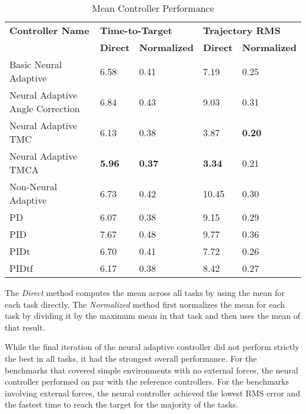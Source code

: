 \documentclass[letterpaper,12pt,titlepage,oneside,final]{book}
\begin{document}
\begin{table}
\begin{threeparttable}
\caption{Mean Controller Performance} \label{table:mean_task_ranking}
\begin{tabular}{| l | l | l | l | l |}
\hline
\textbf{Controller Name} & \multicolumn{2}{l|}{\textbf{Time-to-Target}} & \multicolumn{2}{l|}{\textbf{Trajectory RMS}} \\ \cline{2-5}
& \textbf{Direct} & \textbf{Normalized} & \textbf{Direct} & \textbf{Normalized} \\ \hline
Basic Neural Adaptive & 6.58 & 0.41 & 7.19 & 0.25 \\ \hline
Neural Adaptive Angle Correction & 6.84 & 0.43 & 9.03 & 0.31 \\ \hline
Neural Adaptive TMC & 6.13 & 0.38 & 3.87 & \textbf{0.20} \\ \hline
Neural Adaptive TMCA & \textbf{5.96} & \textbf{0.37} & \textbf{3.34} & 0.21 \\ \hline
Non-Neural Adaptive & 6.73 & 0.42 & 10.45 & 0.30 \\ \hline
PD & 6.07 & 0.38 & 9.15 & 0.29 \\ \hline
PID & 7.67 & 0.48 & 9.77 & 0.36 \\ \hline
PIDt & 6.70 & 0.41 & 7.72 & 0.26 \\ \hline
PIDtf & 6.17 & 0.38 & 8.42 & 0.27 \\ \hline
\end{tabular}
\begin{tablenotes}
\footnotesize
\item The \textit{Direct} method computes the mean across all tasks by using the mean for each task directly. The \textit{Normalized} method first normalizes the mean for each task by dividing it by the maximum mean in that task and then uses the mean of that result.
\end{tablenotes}
\end{threeparttable}
\end{table}

While the final iteration of the neural adaptive controller did not perform strictly the best in all tasks, it had the strongest overall performance.
For the benchmarks that covered simple environments with no external forces, the neural controller performed on par with the reference controllers.
For the benchmarks involving external forces, the neural controller achieved the lowest RMS error and the fastest time to reach the target for the majority of the tasks.
\end{document}
